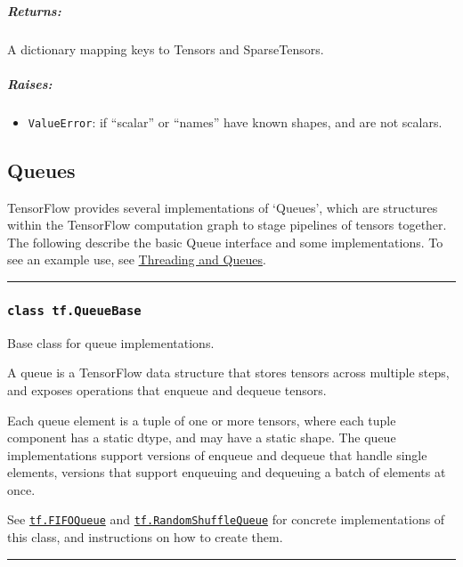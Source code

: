 \subparagraph{Returns: }\label{returns-40}

A dictionary mapping keys to Tensors and SparseTensors.

\subparagraph{Raises: }\label{raises-1}

\begin{itemize}
\tightlist
\item
  \texttt{ValueError}: if ``scalar'' or ``names'' have known shapes, and
  are not scalars.
\end{itemize}

\subsection{Queues }\label{queues}

TensorFlow provides several implementations of `Queues', which are
structures within the TensorFlow computation graph to stage pipelines of
tensors together. The following describe the basic Queue interface and
some implementations. To see an example use, see
\href{../../how_tos/threading_and_queues/index.md}{Threading and
Queues}.

\begin{center}\rule{0.5\linewidth}{\linethickness}\end{center}

\subsubsection{\texorpdfstring{\texttt{class\ tf.QueueBase}
}{class tf.QueueBase }}\label{class-tf.queuebase}

Base class for queue implementations.

A queue is a TensorFlow data structure that stores tensors across
multiple steps, and exposes operations that enqueue and dequeue tensors.

Each queue element is a tuple of one or more tensors, where each tuple
component has a static dtype, and may have a static shape. The queue
implementations support versions of enqueue and dequeue that handle
single elements, versions that support enqueuing and dequeuing a batch
of elements at once.

See \protect\hyperlink{FIFOQueue}{\texttt{tf.FIFOQueue}} and
\protect\hyperlink{RandomShuffleQueue}{\texttt{tf.RandomShuffleQueue}}
for concrete implementations of this class, and instructions on how to
create them.

\begin{center}\rule{0.5\linewidth}{\linethickness}\end{center}

